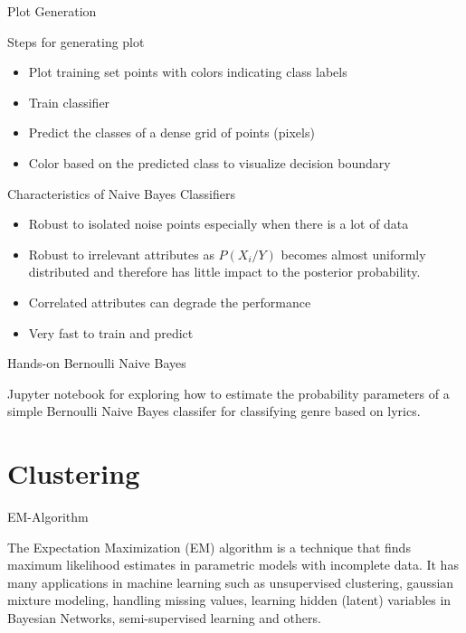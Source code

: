 \documentclass[12pt]{beamer}
\begin{document}
\begin{frame}{Plot Generation}
\begin{block}{Steps for generating plot}  
\begin{itemize}
\item{Plot training set points with colors indicating class labels} 
\pause 
\item{Train classifier} 
\pause
\item{Predict the classes of a dense grid of points (pixels)}
\pause
\item{Color based on the predicted class to visualize decision boundary} 
\pause
\end{itemize}
\end{block}

\end{frame}



\begin{frame}{Characteristics of Naive Bayes Classifiers} 

\begin{itemize}
\item{Robust to isolated noise points especially when there is a lot of data}
\item{Robust to irrelevant attributes as $P(X_i/Y)$ becomes almost uniformly distributed and therefore has little impact to the posterior probability.}
\item{Correlated attributes can degrade the performance} 
\item{Very fast to train and predict} 
\end{itemize}
\end{frame}




\begin{frame}{Hands-on Bernoulli Naive Bayes}

Jupyter notebook for exploring how to estimate the probability
parameters of a simple Bernoulli Naive Bayes classifer for classifying
genre based on lyrics.


\end{frame} 

\section{Clustering} 

\begin{frame}{EM-Algorithm} 

\begin{definition} 
The Expectation Maximization (EM) algorithm is a technique that finds
maximum likelihood estimates in parametric models with incomplete
data. It has many applications in machine learning such as
unsupervised clustering, gaussian mixture modeling, handling missing
values, learning hidden (latent) variables in Bayesian Networks, semi-supervised learning
 and others.
\end{definition} 
\end{frame}
\end{document}
